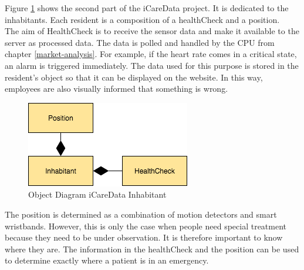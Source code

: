 \clearpage
Figure \ref{fig:iCareDataInhabitant} shows the second part of the iCareData project. It is dedicated to the inhabitants. Each resident is a composition of a healthCheck and a position.
\\
The aim of HealthCheck is to receive the sensor data and make it available to the server as processed data. The data is polled and handled by the CPU from chapter \ref{market-analysis}. For example, if the heart rate comes in a critical state, an alarm is triggered immediately. The data used for this purpose is stored in the resident's object so that it can be displayed on the website. In this way, employees are also visually informed that something is wrong.
\begin{figure}[h]
	\centering
	\includegraphics[width=.5\textwidth]{images/iCareDataInhabitant}
	\caption{Object Diagram iCareData Inhabitant}
	\label{fig:iCareDataInhabitant}
\end{figure}
The position is determined as a combination of motion detectors and smart wristbands. However, this is only the case when people need special treatment because they need to be under observation. It is therefore important to know where they are. The information in the healthCheck and the position can be used to determine exactly where a patient is in an emergency.
